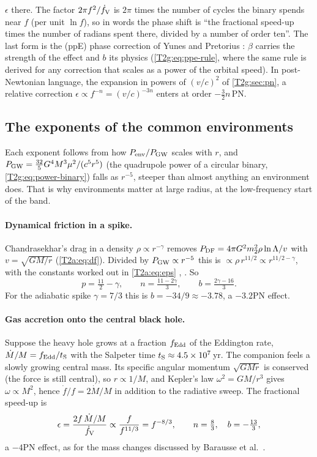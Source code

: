 $\epsilon$ there. The factor $2\pi f^2/\dot f_{\rm V}$ is $2\pi$ times the number of cycles the binary spends near $f$
(per unit $\ln f$), so in words the phase shift is ``the fractional speed-up times the number of radians spent there,
divided by a number of order ten''. The last form is the  (ppE) phase
correction of Yunes and Pretorius \cite[eq.~(1)]{YunesPretorius2009}: $\beta$ carries the strength of the effect and
$b$ its physics (\cref{T2g:eq:ppe-rule}, where the same rule is derived for any correction that scales as a power of
the orbital speed). In post-Newtonian language, the expansion in powers of $(v/c)^2$ of \cref{T2g:sec:pn}, a relative
correction $\epsilon\propto f^{-n}=(v/c)^{-3n}$ enters at order $-\tfrac32n$\,PN.

\subsection{The exponents of the common environments}
\label{10b:sec:env-exponents}

Each exponent follows from how $P_{\rm env}/P_{\rm GW}$ scales with $r$, and $P_{\rm GW}=\tfrac{32}5G^4M^3\mu^2/(c^5r^5)$
(the quadrupole power of a circular binary, \cref{T2g:eq:power-binary})
falls as $r^{-5}$, steeper than almost anything an environment does. That is why environments matter at large radius,
at the low-frequency start of the band.

\paragraph{Dynamical friction in a spike.} Chandrasekhar's drag in a density $\rho\propto r^{-\gamma}$ removes
$P_{\rm DF}=4\pi G^2m_2^2\rho\ln\Lambda/v$ with $v=\sqrt{GM/r}$ (\cref{T2a:eq:df}). Divided by $P_{\rm GW}\propto r^{-5}$
this is $\propto\rho\,r^{11/2}\propto r^{11/2-\gamma}$, with the constants worked out in \cref{T2a:eq:eps}
\cite[eq.~(16)]{Eda2015}, \cite[eq.~(16)]{Speeney2022}. So
\[
  p=\tfrac{11}2-\gamma,\qquad n=\tfrac{11-2\gamma}{3},\qquad b=\tfrac{2\gamma-16}{3}.
\]
For the adiabatic spike $\gamma=7/3$ this is $b=-34/9\approx-3.78$, a $-3.2$PN effect.

\paragraph{Gas accretion onto the central black hole.} Suppose the heavy hole grows at a fraction $f_{\rm Edd}$ of the
Eddington rate, $\dot M/M=f_{\rm Edd}/t_{\rm S}$ with the Salpeter time $t_{\rm S}\approx4.5\times10^7$\,yr. The
companion feels a slowly growing central mass. Its specific angular momentum $\sqrt{GMr}$ is conserved (the force is
still central), so $r\propto1/M$, and Kepler's law $\omega^2=GM/r^3$ gives $\omega\propto M^2$, hence
$\dot f/f=2\dot M/M$ in addition to the radiative sweep. The fractional speed-up is
\begin{equation*}
  \epsilon=\frac{2f\,\dot M/M}{\dot f_{\rm V}}\propto\frac{f}{f^{11/3}}=f^{-8/3},
  \qquad n=\tfrac83,\quad b=-\tfrac{13}3 ,
\end{equation*}
a $-4$PN effect, as for the mass changes discussed by Barausse et al.\ \cite[Sec.~XII]{Barausse2014}.

